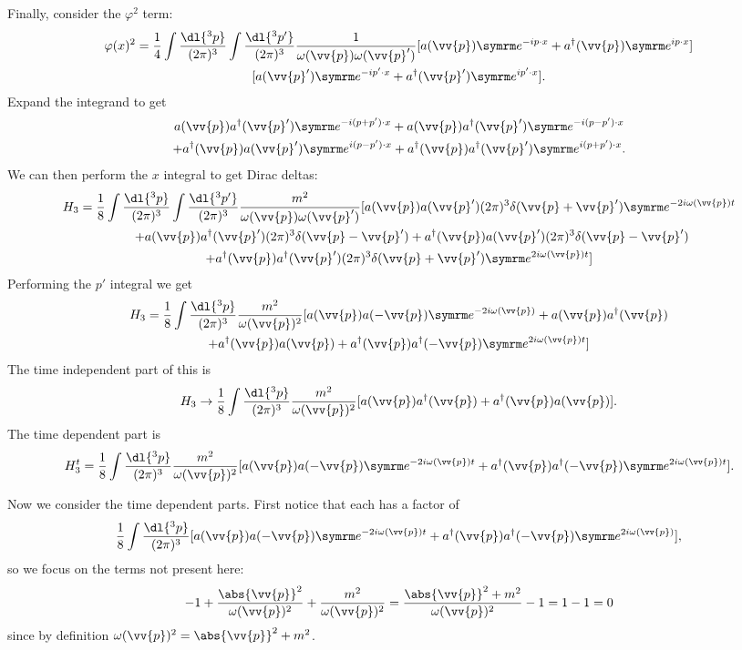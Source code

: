 Finally, consider the \(\varphi^2\) term:
\begin{multline}
    \varphi(x)^2 = \frac{1}{4} \int \frac{\dl{^3p}}{(2\pi)^3} \int \frac{\dl{^3p'}}{(2\pi)^3} \frac{1}{\omega(\vv{p})\omega(\vv{p}')} [a(\vv{p})\e^{-ip\cdot x} + a^\hermit(\vv{p})\e^{ip\cdot x}]\\
    [a(\vv{p}')\e^{-ip'\cdot x} + a^\hermit(\vv{p}')\e^{ip'\cdot x}].
\end{multline}
Expand the integrand to get
\begin{multline}
    a(\vv{p})a^\hermit(\vv{p}')\e^{-i(p + p')\cdot x} + a(\vv{p})a^\hermit(\vv{p}')\e^{-i(p - p')\cdot x}\\
    + a^\hermit(\vv{p})a(\vv{p}')\e^{i(p - p')\cdot x} + a^\hermit(\vv{p})a^\hermit(\vv{p}')\e^{i(p + p')\cdot x}.
\end{multline}
We can then perform the \(x\) integral to get Dirac deltas:
\begin{multline}
    H_3 = \frac{1}{8} \int \frac{\dl{^3p}}{(2\pi)^3} \int \frac{\dl{^3p'}}{(2\pi)^3} \frac{m^2}{\omega(\vv{p})\omega(\vv{p}')} [a(\vv{p})a(\vv{p}')(2\pi)^3\delta(\vv{p} + \vv{p}')\e^{-2i\omega(\vv{p})t}\\
    \qquad+ a(\vv{p})a^\hermit(\vv{p}')(2\pi)^3\delta(\vv{p} - \vv{p}') + a^\hermit(\vv{p})a(\vv{p}')(2\pi)^3\delta(\vv{p} - \vv{p}')\\
    + a^\hermit(\vv{p})a^\hermit(\vv{p}')(2\pi)^3\delta(\vv{p} + \vv{p}')\e^{2i\omega(\vv{p})t}]
\end{multline}
Performing the \(p'\) integral we get
\begin{multline}
    H_3 = \frac{1}{8} \int \frac{\dl{^3p}}{(2\pi)^3} \frac{m^2}{\omega(\vv{p})^2} [a(\vv{p})a(-\vv{p})\e^{-2i\omega(\vv{p})} + a(\vv{p})a^\hermit(\vv{p})\\
    + a^\hermit(\vv{p})a(\vv{p}) + a^\hermit(\vv{p})a^\hermit(-\vv{p})\e^{2i\omega(\vv{p})t}]
\end{multline}
The time independent part of this is
\begin{equation}
    H_3 \to \frac{1}{8}\int\frac{\dl{^3p}}{(2\pi)^3} \frac{m^2}{\omega(\vv{p})^2} [a(\vv{p})a^\hermit(\vv{p}) + a^\hermit(\vv{p})a(\vv{p})].
\end{equation}
The time dependent part is
\begin{equation}
    H_3^t = \frac{1}{8} \int \frac{\dl{^3p}}{(2\pi)^3} \frac{m^2}{\omega(\vv{p})^2} [a(\vv{p})a(-\vv{p})\e^{-2i\omega(\vv{p})t} + a^\hermit(\vv{p})a^\hermit(-\vv{p})\e^{2i\omega(\vv{p})t}].
\end{equation}

Now we consider the time dependent parts.
First notice that each has a factor of
\begin{equation}
    \frac{1}{8} \int \frac{\dl{^3p}}{(2\pi)^3} [a(\vv{p})a(-\vv{p})\e^{-2i\omega(\vv{p})t} + a^\hermit(\vv{p})a^\hermit(-\vv{p})\e^{2i\omega(\vv{p})}],
\end{equation}
so we focus on the terms not present here:
\begin{equation}
    -1 + \frac{\abs{\vv{p}}^2}{\omega(\vv{p})^2} + \frac{m^2}{\omega(\vv{p})^2} = \frac{\abs{\vv{p}}^2 + m^2}{\omega(\vv{p})^2} - 1 = 1 - 1 = 0
\end{equation}
since by definition \(\omega(\vv{p})^2 = \abs{\vv{p}}^2 + m^2\).